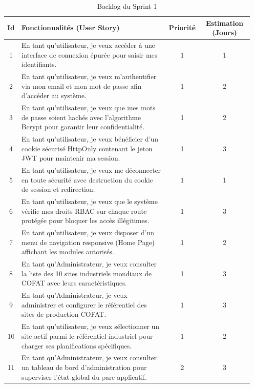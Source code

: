 \begin{table}[H]
\centering
\begin{tabular}{|c|p{9.2cm}|c|c|}
\hline
\textbf{Id} & \textbf{Fonctionnalités (User Story)} & \textbf{Priorité} & \textbf{Estimation (Jours)} \\ \hline
1 & En tant qu'utilisateur, je veux accéder à une interface de connexion épurée pour saisir mes identifiants. & 1 & 1 \\ \hline
2 & En tant qu'utilisateur, je veux m'authentifier via mon email et mon mot de passe afin d'accéder au système. & 1 & 2 \\ \hline
3 & En tant qu'utilisateur, je veux que mes mots de passe soient hachés avec l'algorithme Bcrypt pour garantir leur confidentialité. & 1 & 2 \\ \hline
4 & En tant qu'utilisateur, je veux bénéficier d'un cookie sécurisé HttpOnly contenant le jeton JWT pour maintenir ma session. & 1 & 3 \\ \hline
5 & En tant qu'utilisateur, je veux me déconnecter en toute sécurité avec destruction du cookie de session et redirection. & 1 & 1 \\ \hline
6 & En tant qu'utilisateur, je veux que le système vérifie mes droits RBAC sur chaque route protégée pour bloquer les accès illégitimes. & 1 & 3 \\ \hline
7 & En tant qu'utilisateur, je veux disposer d'un menu de navigation responsive (Home Page) affichant les modules autorisés. & 1 & 2 \\ \hline
8 & En tant qu'Administrateur, je veux consulter la liste des 10 sites industriels mondiaux de COFAT avec leurs caractéristiques. & 1 & 3 \\ \hline
9 & En tant qu'Administrateur, je veux administrer et configurer le référentiel des sites de production COFAT. & 1 & 3 \\ \hline
10 & En tant qu'utilisateur, je veux sélectionner un site actif parmi le référentiel industriel pour charger ses planifications spécifiques. & 1 & 2 \\ \hline
11 & En tant qu'Administrateur, je veux consulter un tableau de bord d'administration pour superviser l'état global du parc applicatif. & 2 & 3 \\ \hline
\end{tabular}
\caption{Backlog du Sprint 1}
\label{tab:backlog_sprint1}
\end{table}

